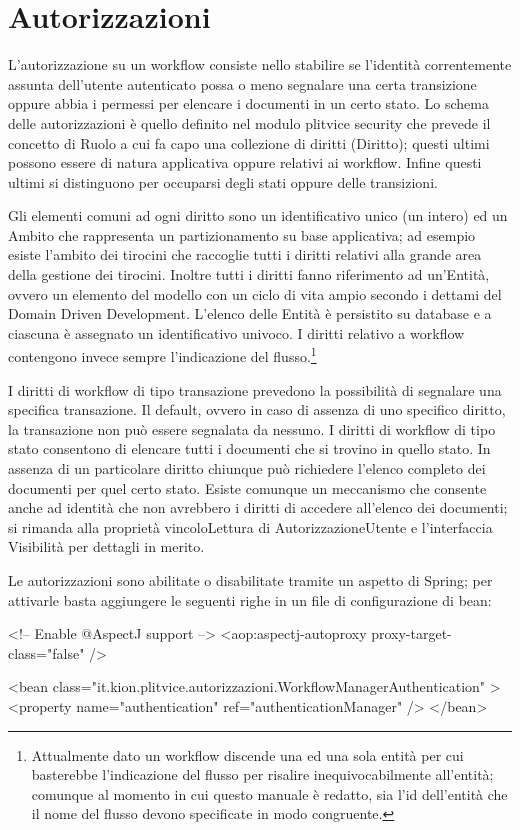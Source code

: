 \section{Autorizzazioni}

L'autorizzazione su un workflow consiste nello stabilire se l'identità correntemente assunta dell'utente autenticato possa o meno segnalare una certa transizione oppure abbia i permessi per elencare i documenti in un certo stato. Lo schema delle autorizzazioni è quello definito nel modulo plitvice security che prevede il concetto di Ruolo a cui fa capo una collezione di diritti (Diritto); questi ultimi possono essere di natura applicativa oppure relativi ai workflow. Infine questi ultimi si distinguono per occuparsi degli stati oppure delle transizioni.

Gli elementi comuni ad ogni diritto sono un identificativo unico (un intero) ed un Ambito che rappresenta un partizionamento su base applicativa; ad esempio esiste l'ambito dei tirocini che raccoglie tutti i diritti relativi alla grande area della gestione dei tirocini. Inoltre tutti i diritti fanno riferimento ad un'Entità, ovvero un elemento del modello con un ciclo di vita ampio secondo i dettami del Domain Driven Development. L'elenco delle Entità è persistito su database e a ciascuna è assegnato un identificativo univoco. I diritti relativo a workflow contengono invece sempre l'indicazione del flusso.\footnote{Attualmente dato un workflow discende una ed una sola entità per cui basterebbe l'indicazione del flusso per risalire inequivocabilmente all'entità; comunque al momento in cui questo manuale è redatto, sia l'id dell'entità che il nome del flusso devono specificate in modo congruente.}

I diritti di workflow di tipo transazione prevedono la possibilità di segnalare una specifica transazione. Il default, ovvero in caso di assenza di uno specifico diritto, la transazione non può essere segnalata da nessuno.
I diritti di workflow di tipo stato consentono di elencare tutti i documenti che si trovino in quello stato. In assenza di un particolare diritto chiunque può richiedere l'elenco completo dei documenti per quel certo stato. Esiste comunque un meccanismo che consente anche ad identità che non avrebbero i diritti di accedere all'elenco dei documenti; si rimanda alla proprietà vincoloLettura di AutorizzazioneUtente e l'interfaccia Visibilità per dettagli in merito.

Le autorizzazioni sono abilitate o disabilitate tramite un aspetto di Spring; per attivarle  basta aggiungere le seguenti righe in un file di configurazione di bean:
\begin{xml}
<!-- Enable @AspectJ support -->
<aop:aspectj-autoproxy proxy-target-class="false" />
  
<bean class="it.kion.plitvice.autorizzazioni.WorkflowManagerAuthentication" >
   <property name="authentication" ref="authenticationManager" />
</bean>
\end{xml}

